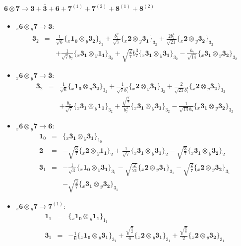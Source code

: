 \documentclass[english]{article}
\newcommand{\rep}[1]{\mathbf{#1}}
\newcommand{\repx}[2]{{}_{#2}\mathbf{#1}}
\newcommand{\subcg}[3]{\big\{ \repx{#1}{x}\otimes\repx{#2}{y}\big\}^{}_{#3}}
\begin{document}
\paragraph*{\Large $\rep{6}\otimes\rep{7}\to\rep{3}+\rep{\bar{3}}+\rep{6}+\rep{7}^{(1)}+\rep{7}^{(2)}+\rep{8}^{(1)}+\rep{8}^{(2)}$}
\begin{itemize}
\item $\repx{6}{x}\otimes\repx{7}{y}\to\rep{3}$:
\begin{eqnarray*}
\rep{3}_{2} &=& \frac{1}{\sqrt{6}}\subcg{1_{0}}{3_{2}}{3_{2}}+\frac{b_7^2}{\sqrt{7}}\subcg{2}{3_{1}}{3_{2}}+\frac{2 b_7^4}{\sqrt{21}}\subcg{2}{3_{2}}{3_{2}} \\ 
 & & +\frac{1}{\sqrt{7} b_7}\subcg{3_{1}}{1_{1}}{3_{2}}+\sqrt{\frac{2}{7}} b_7^3\subcg{3_{1}}{3_{1}}{3_{2}}-\frac{b_7}{\sqrt{14}}\subcg{3_{1}}{3_{2}}{3_{2}}
\end{eqnarray*}
\item $\repx{6}{x}\otimes\repx{7}{y}\to\rep{\bar{3}}$:
\begin{eqnarray*}
\rep{3}_{2} &=& \frac{1}{\sqrt{6}}\subcg{1_{0}}{3_{2}}{3_{2}}+\frac{1}{\sqrt{7} b_7^2}\subcg{2}{3_{1}}{3_{2}}+\frac{2}{\sqrt{21} b_7^4}\subcg{2}{3_{2}}{3_{2}} \\ 
 & & +\frac{b_7}{\sqrt{7}}\subcg{3_{1}}{1_{1}}{3_{2}}+\frac{\sqrt{\frac{2}{7}}}{b_7^3}\subcg{3_{1}}{3_{1}}{3_{2}}-\frac{1}{\sqrt{14} b_7}\subcg{3_{1}}{3_{2}}{3_{2}}
\end{eqnarray*}
\item $\repx{6}{x}\otimes\repx{7}{y}\to\rep{6}$:
\begin{eqnarray*}
\rep{1}_{0} &=& \subcg{3_{1}}{3_{1}}{1_{0}}
\\
\rep{2} &=& -\sqrt{\frac{3}{7}}\subcg{2}{1_{1}}{2}+\frac{1}{\sqrt{7}}\subcg{3_{1}}{3_{1}}{2}-\sqrt{\frac{3}{7}}\subcg{3_{1}}{3_{2}}{2}
\\
\rep{3}_{1} &=& -\frac{1}{\sqrt{3}}\subcg{1_{0}}{3_{1}}{3_{1}}-\sqrt{\frac{2}{21}}\subcg{2}{3_{1}}{3_{1}}-\sqrt{\frac{2}{7}}\subcg{2}{3_{2}}{3_{1}} \\ 
 & & -\sqrt{\frac{2}{7}}\subcg{3_{1}}{3_{2}}{3_{1}}
\end{eqnarray*}
\item $\repx{6}{x}\otimes\repx{7}{y}\to\rep{7}^{(1)}$:
\begin{eqnarray*}
\rep{1}_{1} &=& \subcg{1_{0}}{1_{1}}{1_{1}}
\\
\rep{3}_{1} &=& -\frac{1}{6}\subcg{1_{0}}{3_{1}}{3_{1}}+\frac{\sqrt{\frac{7}{2}}}{6}\subcg{2}{3_{1}}{3_{1}}+\frac{\sqrt{\frac{7}{6}}}{2}\subcg{2}{3_{2}}{3_{1}} \\ 

\end{eqnarray*}
\end{itemize}
\end{document}
